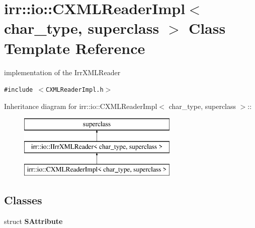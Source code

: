 \hypertarget{classirr_1_1io_1_1_c_x_m_l_reader_impl}{
\section{irr::io::CXMLReaderImpl$<$ char\_\-type, superclass $>$ Class Template Reference}
\label{classirr_1_1io_1_1_c_x_m_l_reader_impl}
}
implementation of the IrrXMLReader  


{\tt \#include $<$CXMLReaderImpl.h$>$}

Inheritance diagram for irr::io::CXMLReaderImpl$<$ char\_\-type, superclass $>$::\begin{figure}[H]
\begin{center}
\leavevmode
\includegraphics[height=3cm]{classirr_1_1io_1_1_c_x_m_l_reader_impl}
\end{center}
\end{figure}
\subsection*{Classes}
\begin{CompactItemize}
\item 
struct \textbf{SAttribute}
\end{CompactItemize}
